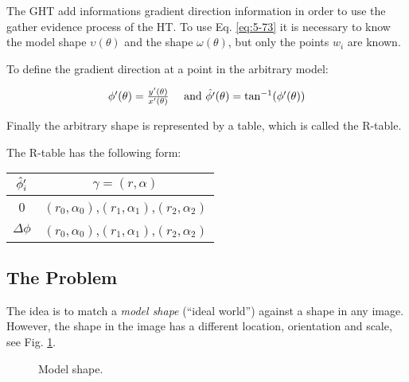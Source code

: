 \documentclass{ws-procs9x6}
\begin{document}

The GHT add informations gradient direction information in order to
use the gather evidence process of the HT.  
To use Eq. \ref{eq:5-73} it is necessary to know the model shape
$\upsilon(\theta)$ and the shape $\omega(\theta)$, but only the points
$w_{i}$ are known.

To define the gradient direction at a point in the arbitrary model:

\begin{equation} 
\begin{array}{cc}
\phi\sp{\prime}(\theta) =
\frac{y\sp{\prime}(\theta)}{x\sp{\prime}(\theta)}
& \text{ and }\hat{\phi\sp{\prime}}(\theta)=\tan^{-1}(\phi\sp{\prime}(\theta))
\end{array}
\label{eq:5-75}
\end{equation}


Finally the arbitrary shape is represented by a table, which is called
the R-table.

The R-table has the following form:



\begin{table}[ph]
{\footnotesize
\begin{tabular}{cc}
\hline
$\hat{\phi}\sp{\prime}_{i}$ & $\gamma=(r,\alpha)$ \\\hline
0 & $(r_{0},\alpha_{0})$,$(r_{1},\alpha_{1})$,$(r_{2},\alpha_{2})$  \\
$\Delta \phi$ & $(r_{0},\alpha_{0})$,$(r_{1},\alpha_{1})$,$(r_{2},\alpha_{2})$  \\
\hline
\end{tabular}\label{tab:r-table} }
\vspace*{-13pt}
\end{table}


\subsection{The Problem}


The idea is to match a \emph{model shape} (``ideal world'') against a
shape in any image.  
However, the shape in the image has a different location, orientation
and scale, see Fig. \ref{fig:1}.

\begin{figure}
\centering
{}
\caption{Model shape.}
\label{fig:1}
\end{figure}
\end{document}
